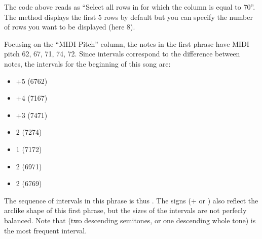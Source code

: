 \documentclass[letterpaper,10pt,english]{sphinxmanual}
\begin{document}
The code above reads as “Select all rows in  for which the column  is equal to 70”. The  method displays the first 5 rows by default but you can specify the number of rows you want to be displayed (here 8).

Focusing on the “MIDI Pitch” column, the notes in the first phrase have MIDI pitch 62, 67, 71, 74, 72. Since intervals correspond to the difference between notes, the intervals for the beginning of this song are:
\begin{itemize}
\item {} 
+5 (67\sphinxhyphen{}62)

\item {} 
+4 (71\sphinxhyphen{}67)

\item {} 
+3 (74\sphinxhyphen{}71)

\item {} 
\sphinxhyphen{}2 (72\sphinxhyphen{}74)

\item {} 
\sphinxhyphen{}1 (71\sphinxhyphen{}72)

\item {} 
\sphinxhyphen{}2 (69\sphinxhyphen{}71)

\item {} 
\sphinxhyphen{}2 (67\sphinxhyphen{}69)

\end{itemize}

The sequence of intervals in this phrase is thus . The signs (+ or \sphinxhyphen{}) also reflect the arc\sphinxhyphen{}like shape of this first phrase, but the sizes of the intervals are not perfecly balanced. Note that  (two descending semitones, or one descending whole tone) is the most frequent interval.
\end{document}
